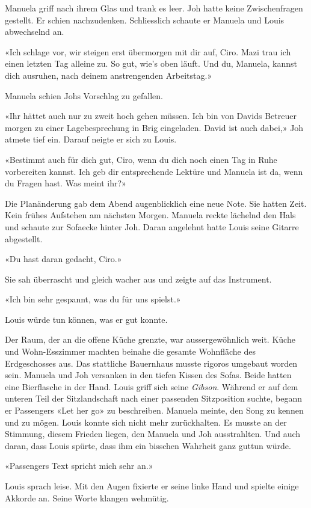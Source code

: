 Manuela griff nach ihrem Glas und trank es leer. Joh hatte keine Zwischenfragen
gestellt. Er schien nachzudenken. Schliesslich schaute er 
Manuela und Louis abwechselnd an. 

«Ich schlage vor, wir steigen erst übermorgen mit dir auf, Ciro. Mazi
trau ich einen letzten Tag alleine zu. So gut, wie’s oben läuft. Und du, Manuela, 
kannst dich ausruhen, nach deinem anstrengenden Arbeitstag.»

Manuela schien Johs Vorschlag zu gefallen. 

«Ihr hättet auch nur zu zweit hoch gehen müssen. Ich bin von
Davids Betreuer morgen zu einer Lagebesprechung in Brig eingeladen.
David ist auch dabei,» Joh atmete tief ein. Darauf neigte er sich zu
Louis.

«Bestimmt auch für dich gut, Ciro, wenn du dich noch einen Tag in
Ruhe vorbereiten kannst. Ich geb dir entsprechende Lektüre und Manuela
ist da, wenn du Fragen hast. Was meint ihr?»

Die Planänderung gab dem Abend augenblicklich eine neue Note. Sie
hatten Zeit. Kein frühes Aufstehen am nächsten Morgen. Manuela reckte
lächelnd den Hals und schaute zur Sofaecke hinter Joh. Daran angelehnt
hatte Louis seine Gitarre abgestellt.

«Du hast daran gedacht, Ciro.»

Sie sah überrascht und gleich wacher aus und zeigte auf das Instrument.

«Ich bin sehr gespannt, was du für uns spielst.»

Louis würde tun können, was er gut konnte.

Der Raum, der an die offene Küche grenzte, war aussergewöhnlich weit.
Küche und Wohn-Esszimmer machten beinahe die gesamte Wohnfläche des
Erdgeschosses aus. Das stattliche Bauernhaus musste rigoros umgebaut
worden sein.
Manuela und Joh versanken in den tiefen Kissen des Sofas. Beide hatten
eine Bierflasche in der Hand. Louis griff sich seine \emph{Gibson}.
Während er auf dem unteren Teil der Sitzlandschaft nach einer passenden
Sitzposition suchte, begann er Passengers «Let her go» zu
beschreiben. Manuela meinte, den Song zu kennen und zu mögen. Louis
konnte sich nicht mehr zurückhalten. Es musste an der Stimmung,
diesem Frieden liegen, den Manuela und Joh ausstrahlten. Und auch daran,
dass Louis spürte, dass ihm ein bisschen Wahrheit ganz guttun würde. 

«Passengers Text spricht mich sehr an.»

Louis sprach leise. Mit den Augen fixierte er seine linke Hand und
spielte einige Akkorde an. Seine Worte klangen wehmütig.

